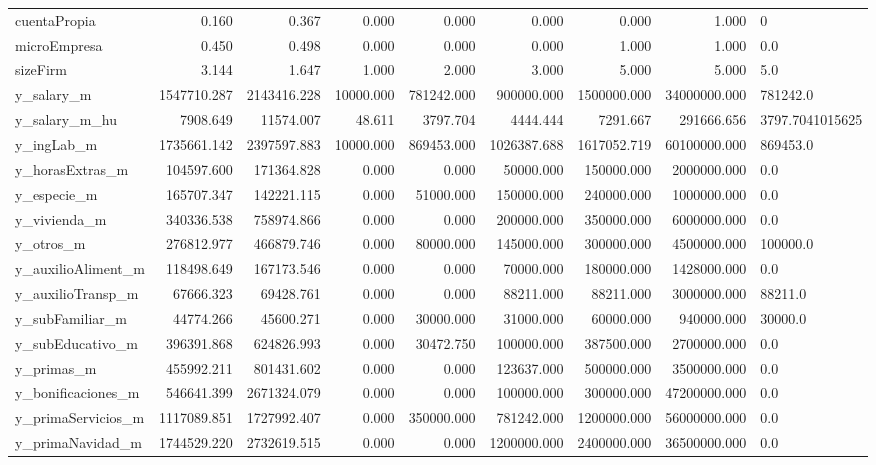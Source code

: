 \begin{longtable}{lrrrrrrrl}
cuentaPropia & 0.160 & 0.367 & 0.000 & 0.000 & 0.000 & 0.000 & 1.000 & 0 \\
microEmpresa & 0.450 & 0.498 & 0.000 & 0.000 & 0.000 & 1.000 & 1.000 & 0.0 \\
sizeFirm & 3.144 & 1.647 & 1.000 & 2.000 & 3.000 & 5.000 & 5.000 & 5.0 \\
y\_salary\_m & 1547710.287 & 2143416.228 & 10000.000 & 781242.000 & 900000.000 & 1500000.000 & 34000000.000 & 781242.0 \\
y\_salary\_m\_hu & 7908.649 & 11574.007 & 48.611 & 3797.704 & 4444.444 & 7291.667 & 291666.656 & 3797.7041015625 \\
y\_ingLab\_m & 1735661.142 & 2397597.883 & 10000.000 & 869453.000 & 1026387.688 & 1617052.719 & 60100000.000 & 869453.0 \\
y\_horasExtras\_m & 104597.600 & 171364.828 & 0.000 & 0.000 & 50000.000 & 150000.000 & 2000000.000 & 0.0 \\
y\_especie\_m & 165707.347 & 142221.115 & 0.000 & 51000.000 & 150000.000 & 240000.000 & 1000000.000 & 0.0 \\
y\_vivienda\_m & 340336.538 & 758974.866 & 0.000 & 0.000 & 200000.000 & 350000.000 & 6000000.000 & 0.0 \\
y\_otros\_m & 276812.977 & 466879.746 & 0.000 & 80000.000 & 145000.000 & 300000.000 & 4500000.000 & 100000.0 \\
y\_auxilioAliment\_m & 118498.649 & 167173.546 & 0.000 & 0.000 & 70000.000 & 180000.000 & 1428000.000 & 0.0 \\
y\_auxilioTransp\_m & 67666.323 & 69428.761 & 0.000 & 0.000 & 88211.000 & 88211.000 & 3000000.000 & 88211.0 \\
y\_subFamiliar\_m & 44774.266 & 45600.271 & 0.000 & 30000.000 & 31000.000 & 60000.000 & 940000.000 & 30000.0 \\
y\_subEducativo\_m & 396391.868 & 624826.993 & 0.000 & 30472.750 & 100000.000 & 387500.000 & 2700000.000 & 0.0 \\
y\_primas\_m & 455992.211 & 801431.602 & 0.000 & 0.000 & 123637.000 & 500000.000 & 3500000.000 & 0.0 \\
y\_bonificaciones\_m & 546641.399 & 2671324.079 & 0.000 & 0.000 & 100000.000 & 300000.000 & 47200000.000 & 0.0 \\
y\_primaServicios\_m & 1117089.851 & 1727992.407 & 0.000 & 350000.000 & 781242.000 & 1200000.000 & 56000000.000 & 0.0 \\
y\_primaNavidad\_m & 1744529.220 & 2732619.515 & 0.000 & 0.000 & 1200000.000 & 2400000.000 & 36500000.000 & 0.0 \\

\end{longtable}

